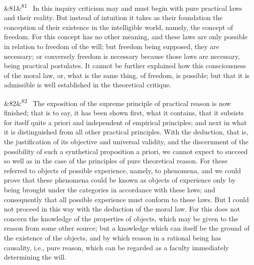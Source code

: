 \documentclass[12pt]{article}
\newcommand{\para}[1][]{\par\noindent\ifx&#1&\else\textsuperscript{\footnotesize #1}~\fi}
\begin{document}
\para[81] In this inquiry criticism may and must begin with pure practical laws and their reality. But instead of intuition it takes as their foundation the conception of their existence in the intelligible world, namely, the concept of freedom. For this concept has no other meaning, and these laws are only possible in relation to freedom of the will; but freedom being supposed, they are necessary; or conversely freedom is necessary because those laws are necessary, being practical postulates. It cannot be further explained how this consciousness of the moral law, or, what is the same thing, of freedom, is possible; but that it is admissible is well established in the theoretical critique.

\para[82] The exposition of the supreme principle of practical reason is now finished; that is to say, it has been shown first, what it contains, that it subsists for itself quite a priori and independent of empirical principles; and next in what it is distinguished from all other practical principles. With the deduction, that is, the justification of its objective and universal validity, and the discernment of the possibility of such a synthetical proposition a priori, we cannot expect to succeed so well as in the case of the principles of pure theoretical reason. For these referred to objects of possible experience, namely, to phenomena, and we could prove that these phenomena could be known as objects of experience only by being brought under the categories in accordance with these laws; and consequently that all possible experience must conform to these laws. But I could not proceed in this way with the deduction of the moral law. For this does not concern the knowledge of the properties of objects, which may be given to the reason from some other source; but a knowledge which can itself be the ground of the existence of the objects, and by which reason in a rational being has causality, i.e., pure reason, which can be regarded as a faculty immediately determining the will.
\end{document}
